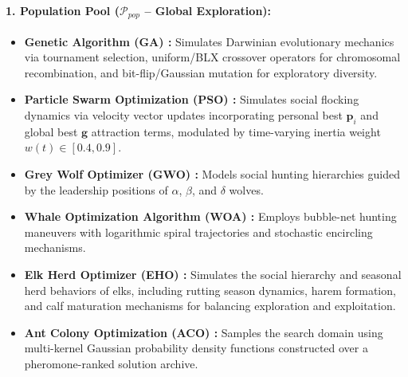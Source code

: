\documentclass[review]{elsarticle}
\begin{document}
\paragraph{1. Population Pool ($\mathcal{P}_{pop}$ -- Global Exploration):}
\begin{itemize}
    \item \textbf{Genetic Algorithm (GA) \cite{chu1998genetic}:} Simulates Darwinian evolutionary mechanics via tournament selection, uniform/BLX crossover operators for chromosomal recombination, and bit-flip/Gaussian mutation for exploratory diversity.
    \item \textbf{Particle Swarm Optimization (PSO) \cite{kennedy1995particle}:} Simulates social flocking dynamics via velocity vector updates incorporating personal best $\mathbf{p}_i$ and global best $\mathbf{g}$ attraction terms, modulated by time-varying inertia weight $w(t) \in [0.4, 0.9]$.
    \item \textbf{Grey Wolf Optimizer (GWO) \cite{mirjalili2014grey}:} Models social hunting hierarchies guided by the leadership positions of $\alpha$, $\beta$, and $\delta$ wolves.
    \item \textbf{Whale Optimization Algorithm (WOA) \cite{mirjalili2016whale}:} Employs bubble-net hunting maneuvers with logarithmic spiral trajectories and stochastic encircling mechanisms.
    \item \textbf{Elk Herd Optimizer (EHO) \cite{albetar2024elk}:} Simulates the social hierarchy and seasonal herd behaviors of elks, including rutting season dynamics, harem formation, and calf maturation mechanisms for balancing exploration and exploitation.
    \item \textbf{Ant Colony Optimization (ACO) \cite{dorigo2004ant}:} Samples the search domain using multi-kernel Gaussian probability density functions constructed over a pheromone-ranked solution archive.
\end{itemize}
\end{document}
